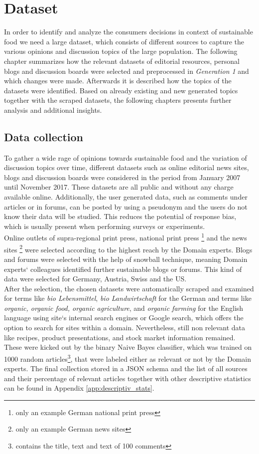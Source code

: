 \chapter{Dataset}
In order to identify and analyze the consumers decisions in context of sustainable food we need a large dataset, which consists of different sources to capture the various opinions and discussion topics of the large population.
The following chapter summarizes how the relevant datasets of editorial resources, personal blogs and discussion boards were selected and preprocessed in \textit{Generation 1} and which changes were made.
Afterwards it is described how the topics of the datasets were identified.
Based on already existing and new generated topics together with the scraped datasets, the following chapters presents further analysis and additional insights.

\section{Data collection}
To gather a wide rage of opinions towards sustainable food and the variation of discussion topics over time, different datasets such as online editorial news sites, blogs and discussion boards were considered in the period from January 2007 until November 2017. These datasets are all public and without any charge available  online. Additionally, the user generated data, such as comments under articles or in forums, can be posted by using a pseudonym and the users do not know their data will be studied. This reduces the potential of response bias, which is usually present when performing surveys or experiments.\\

Online outlets of supra-regional print press, national print press \citep{IVW2018}\footnote{only an example German national print press} and the news sites \citep{AGOF2018}\footnote{only an example German news sites} were selected  according to the highest reach by the Domain experts. Blogs and forums were selected with the help of snowball technique, meaning Domain experts` colleagues identified further sustainable blogs or forums. This kind of data were selected for Germany, Austria, Swiss and the US.\\

After the selection, the chosen datasets were automatically scraped and examined for terms like \textit{bio Lebensmittel}, \textit{ bio Landwirtschaft} for the German and terms like \textit{organic, organic food, organic agriculture}, and \textit{organic farming} for the English language using site`s internal search engines or Google search, which offers the option to search for sites within a domain. Nevertheless, still non relevant data like recipes, product presentations, and stock market information remained. These were kicked out by the binary Naive Bayes classifier, which was trained on 1000 random articles\footnote{contains the title, text and text of 100 comments}, that were labeled either as relevant or not by the Domain experts.
The final collection stored in a JSON schema and the list of all sources and their percentage of relevant articles together with other descriptive statistics can be found in Appendix \ref{app:descriptiv_stats}.

